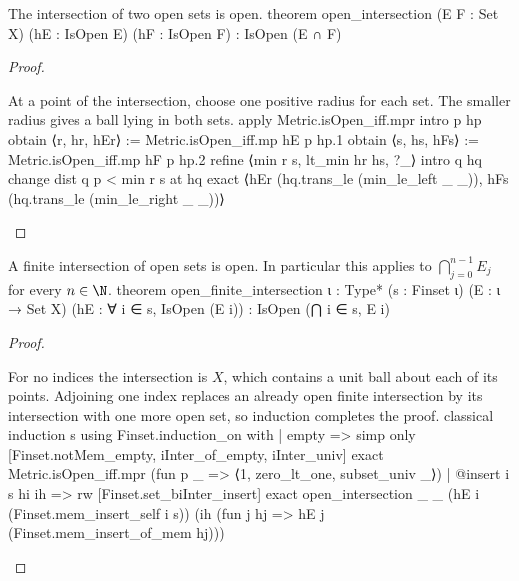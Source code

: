 \begin{lemma} \label{an1:lem:open-intersection}
  \begin{lean}{The intersection of two open sets is open.}
    theorem open_intersection (E F : Set X) (hE : IsOpen E) (hF : IsOpen F) :
        IsOpen (E ∩ F)
  \end{lean}
\end{lemma}

\begin{proof}
  \begin{lean}{At a point of the intersection, choose one positive radius for each set. The smaller radius gives a ball lying in both sets.}
    apply Metric.isOpen_iff.mpr
    intro p hp
    obtain ⟨r, hr, hEr⟩ := Metric.isOpen_iff.mp hE p hp.1
    obtain ⟨s, hs, hFs⟩ := Metric.isOpen_iff.mp hF p hp.2
    refine ⟨min r s, lt_min hr hs, ?_⟩
    intro q hq
    change dist q p < min r s at hq
    exact ⟨hEr (hq.trans_le (min_le_left _ _)), hFs (hq.trans_le (min_le_right _ _))⟩
  \end{lean}

\end{proof}

\begin{proposition} \label{an1:thm:finite-intersection-of-open-sets-is-open}
  \begin{lean}{A finite intersection of open sets is open. In particular this applies to $\bigcap_{j=0}^{n-1}E_j$ for every $n\in\N$.}
    theorem open_finite_intersection {ι : Type*} (s : Finset ι)
        (E : ι → Set X) (hE : ∀ i ∈ s, IsOpen (E i)) :
        IsOpen (⋂ i ∈ s, E i)
  \end{lean}
\end{proposition}

\begin{proof}
  \begin{lean}{For no indices the intersection is $X$, which contains a unit ball about each of its points. Adjoining one index replaces an already open finite intersection by its intersection with one more open set, so induction completes the proof.}
    classical
    induction s using Finset.induction_on with
    | empty =>
      simp only [Finset.notMem_empty, iInter_of_empty, iInter_univ]
      exact Metric.isOpen_iff.mpr (fun p _ => ⟨1, zero_lt_one, subset_univ _⟩)
    | @insert i s hi ih =>
      rw [Finset.set_biInter_insert]
      exact open_intersection _ _ (hE i (Finset.mem_insert_self i s))
        (ih (fun j hj => hE j (Finset.mem_insert_of_mem hj)))
  \end{lean}

\end{proof}

